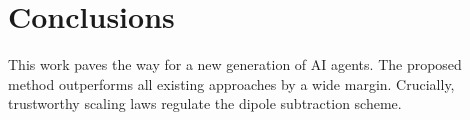 \section{Conclusions}\label{sec:conclusions}

This work paves the way for a new generation of AI agents. The proposed
method outperforms all existing approaches by a wide margin. Crucially,
trustworthy scaling laws regulate the dipole subtraction scheme.

